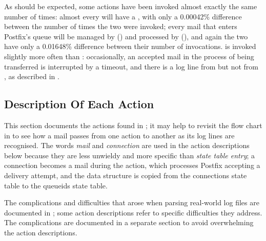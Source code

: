 As should be expected, some actions have been invoked almost exactly the
same number of times: almost every  will have a
, with only a 0.00042\% difference between the number of
times the two were invoked; every mail that enters Postfix's queue will be
managed by  () and processed by
 (), and again the two have
only a 0.01648\% difference between their number of invocations.
 is invoked slightly more often than
: occasionally, an accepted mail in the process of
being transferred is interrupted by a timeout, and there is a log line from
 but not from , as described in
.



\FloatBarrier{}

\subsection{Description Of Each Action}

\label{actions in detail in implementation}

This section documents the actions found in \parsername{}; it may help to
revisit the flow chart in  to see how a mail passes
from one action to another as its log lines are recognised.  The words
\textit{mail\/} and \textit{connection\/} are used in the action
descriptions below because they are less unwieldy and more specific than
\textit{state table entry\/}; a connection becomes a mail during the
 action, which processes Postfix accepting a delivery
attempt, and the data structure is copied from the connections state table
to the queueids state table.

The complications and difficulties that arose when parsing real-world log
files are documented in ; some action
descriptions refer to specific difficulties they address.  The
complications are documented in a separate section to avoid overwhelming
the action descriptions.

